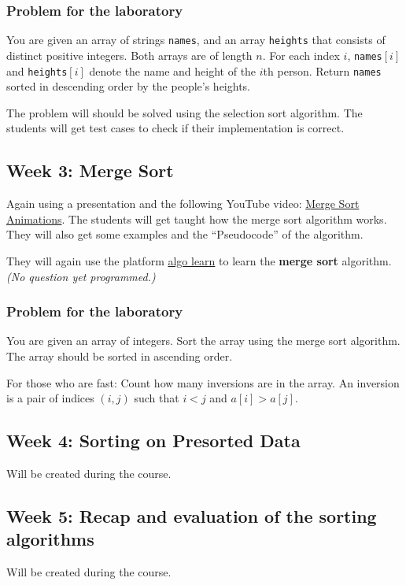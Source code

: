 \documentclass[10pt, oneside]{article}
\theoremstyle{remark}
\begin{document}
\subsubsection*{Problem for the laboratory}
\begin{tcolorbox}
  You are given an array of strings \texttt{names}, and an array \texttt{heights} that consists of distinct positive integers. Both arrays are of length $n$. For each index $i$, \texttt{names}$[i]$ and \texttt{heights}$[i]$ denote the name and height of the $i$th person. Return \texttt{names} sorted in descending order by the people's heights.
\end{tcolorbox}
The problem will should be solved using the selection sort algorithm. The students will get test cases to check if their implementation is correct.

\subsection{Week 3: Merge Sort}
Again using a presentation and the following YouTube video: \href{https://www.youtube.com/watch?v=ZRPoEKHXTJg}{Merge Sort Animations}. The students will get taught how the merge sort algorithm works. They will also get some examples and the \enquote{Pseudocode} of the algorithm.

They will again use the platform \href{https://tcs.uni-frankfurt.de/algo-learn-testing/refs_heads_feat-bubbleSort/en
}{algo learn} to learn the \textbf{merge sort} algorithm. \textit{(No question yet programmed.)}

\subsubsection*{Problem for the laboratory}
\begin{tcolorbox}
  You are given an array of integers. Sort the array using the merge sort algorithm. The array should be sorted in ascending order. 

  For those who are fast: Count how many inversions are in the array. An inversion is a pair of indices $(i, j)$ such that $i < j$ and $a[i] > a[j]$.
\end{tcolorbox}

\subsection{Week 4: Sorting on Presorted Data}
Will be created during the course.

\subsection{Week 5: Recap and evaluation of the sorting algorithms}
Will be created during the course.
\end{document}
